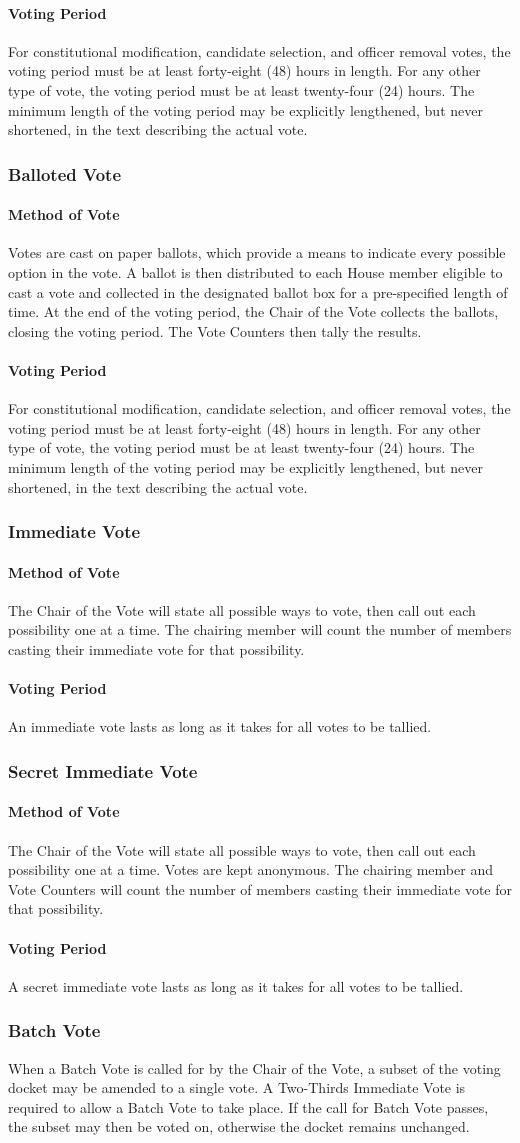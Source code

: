 \documentclass{article}
\newcommand{\asubsection}[1]{\subsubsection{#1} \label{#1}}
\newcommand{\asubsubsection}[1]{\paragraph{#1} \label{#1}}
\begin{document}
\asubsubsection{Voting Period}
For constitutional modification, candidate selection, and officer removal votes, the voting period must be at least forty-eight (48) hours in length.
For any other type of vote, the voting period must be at least twenty-four (24) hours.
The minimum length of the voting period may be explicitly lengthened, but never shortened, in the text describing the actual vote.
\asubsection{Balloted Vote}
\asubsubsection{Method of Vote}
Votes are cast on paper ballots, which provide a means to indicate every possible option in the vote.
A ballot is then distributed to each House member eligible to cast a vote and collected in the designated ballot box for a pre-specified length of time.
At the end of the voting period, the Chair of the Vote collects the ballots, closing the voting period.
The Vote Counters then tally the results.
\asubsubsection{Voting Period}
For constitutional modification, candidate selection, and officer removal votes, the voting period must be at least forty-eight (48) hours in length.
For any other type of vote, the voting period must be at least twenty-four (24) hours.
The minimum length of the voting period may be explicitly lengthened, but never shortened, in the text describing the actual vote.
\asubsection{Immediate Vote}
\asubsubsection{Method of Vote}
The Chair of the Vote will state all possible ways to vote, then call out each possibility one at a time.
The chairing member will count the number of members casting their immediate vote for that possibility.
\asubsubsection{Voting Period}
An immediate vote lasts as long as it takes for all votes to be tallied.
\asubsection{Secret Immediate Vote}
\asubsubsection{Method of Vote}
The Chair of the Vote will state all possible ways to vote, then call out each possibility one at a time.
Votes are kept anonymous.
The chairing member and Vote Counters will count the number of members casting their immediate vote for that possibility.
\asubsubsection{Voting Period}
A secret immediate vote lasts as long as it takes for all votes to be tallied.
\asubsection{Batch Vote}
When a Batch Vote is called for by the Chair of the Vote, a subset of the voting docket may be amended to a single vote.
A Two-Thirds Immediate Vote is required to allow a Batch Vote to take place.
If the call for Batch Vote passes, the subset may then be voted on, otherwise the docket remains unchanged.
\end{document}

